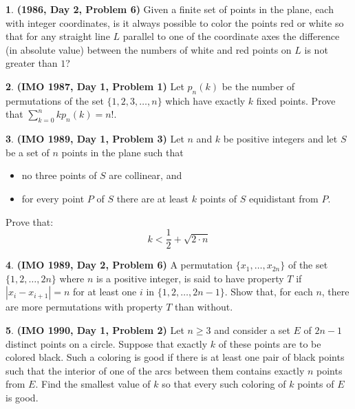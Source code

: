 \documentclass{article}
\newcommand{\plus}{+}
\newcommand{\minus}{-}
\newcommand{\equal}{=}
\theoremstyle{definition}
\newtheorem{p}{}
\begin{document}
\begin{p}{\bf (1986, Day 2, Problem 6)}
Given a finite set of points in the plane, each with integer coordinates, is it always possible to color the points red or white so that for any straight line $L$ parallel to one of the coordinate axes the difference (in absolute value) between the numbers of white and red points on $L$ is not greater than $1$?
\end{p}



\begin{p}{\bf (IMO 1987, Day 1, Problem 1)}
Let $p_n(k)$ be the number of permutations of the set $\{1,2,3,\ldots,n\}$ which have exactly $k$ fixed points. Prove that $\sum_{k=0}^nk p_n(k)=n!$.
\end{p}








\begin{p}{\bf (IMO 1989, Day 1, Problem 3)}
Let $ n$ and $ k$ be positive integers and let $ S$ be a set of $ n$ points in the plane such that

\begin{itemize}

\item no three points of $ S$ are collinear, and

\item for every point $ P$ of $ S$ there are at least $ k$ points of $ S$ equidistant from $ P.$
\end{itemize}

Prove that:
\[ k < \frac {1}{2} \plus{} \sqrt {2 \cdot n}\]
\end{p}






\begin{p}{\bf (IMO 1989, Day 2, Problem 6)}
A permutation $ \{x_1, \ldots, x_{2n}\}$ of the set $ \{1,2, \ldots, 2n\}$ where $ n$ is a positive integer, is said to have property $ T$ if $ |x_i \minus{} x_{i \plus{} 1}| \equal{} n$ for at least one $ i$ in $ \{1,2, \ldots, 2n \minus{} 1\}.$ Show that, for each $ n$, there are more permutations with property $ T$ than without.
\end{p}









\begin{p}{\bf (IMO 1990, Day 1, Problem 2)}
Let $ n \geq 3$ and consider a set $ E$ of $ 2n \minus{} 1$ distinct points on a circle. Suppose that exactly $ k$ of these points are to be colored black.  Such a coloring is good if there is at least one pair of black points such that the interior of one of the arcs between them contains exactly $ n$ points from $ E$.  Find the smallest value of $ k$ so that every such coloring of $ k$ points of $ E$ is good.
\end{p}
\end{document}
